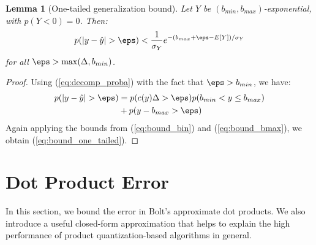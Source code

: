 \documentclass[]{article}
\newtheorem{lemma}{Lemma}[section]
\begin{document}
\begin{lemma}[One-tailed generalization bound] \label{thm:pac_quant_one_tail}
Let $Y$ be $(b_{min}, b_{max})$-exponential, with $p(Y < 0) = 0$. Then:
\begin{align} \label{eq:bound_one_tailed}
    p(|y - \hat{y}| > \eps) <
        \frac{1}{\sigma_Y} e^{-(b_{max} + \eps - E[Y]) / \sigma_Y}
\end{align}
for all $\eps > \max(\Delta, b_{min})$.
\end{lemma}

\begin{proof}
Using (\ref{eq:decomp_proba}) with the fact that $\eps > b_{min}$, we have:
\begin{align} \label{eq:decomp_proba}
    p(|y - \hat{y}| > \eps)
                            &= p(c(y)\Delta > \eps)p(b_{min} < y \le b_{max}) \\
                            &+ p(y - b_{max} > \eps) \nonumber
\end{align}
Again applying the bounds from (\ref{eq:bound_bin}) and (\ref{eq:bound_bmax}), we obtain (\ref{eq:bound_one_tailed}).
\end{proof}


\section{Dot Product Error}
In this section, we bound the error in Bolt's approximate dot products. We also introduce a useful closed-form approximation that helps to explain the high performance of product quantization-based algorithms in general.
\end{document}
